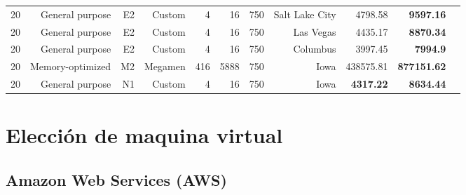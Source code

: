 \documentclass{article}
\begin{document}
\begin{adjustwidth}{-2.5 cm}{-2.5 cm}
\begin{threeparttable}[!htb]
\begin{tabular}{lrrrrrrrrrr}
\cellcolor[HTML]{ffd966}20 &\cellcolor[HTML]{ffd966}General purpose &\cellcolor[HTML]{ffd966}E2 &\cellcolor[HTML]{ffd966}Custom &\cellcolor[HTML]{ffd966}4 &\cellcolor[HTML]{ffd966}16 &\cellcolor[HTML]{ffd966}750 &\cellcolor[HTML]{ffd966}Salt Lake City &\cellcolor[HTML]{ffd966}4798.58 &\cellcolor[HTML]{ffd966}\textbf{9597.16} \\
\cellcolor[HTML]{ffd966}20 &\cellcolor[HTML]{ffd966}General purpose &\cellcolor[HTML]{ffd966}E2 &\cellcolor[HTML]{ffd966}Custom &\cellcolor[HTML]{ffd966}4 &\cellcolor[HTML]{ffd966}16 &\cellcolor[HTML]{ffd966}750 &\cellcolor[HTML]{ffd966}Las Vegas &\cellcolor[HTML]{ffd966}4435.17 &\cellcolor[HTML]{ffd966}\textbf{8870.34} \\
\cellcolor[HTML]{ffd966}20 &\cellcolor[HTML]{ffd966}General purpose &\cellcolor[HTML]{ffd966}E2 &\cellcolor[HTML]{ffd966}Custom &\cellcolor[HTML]{ffd966}4 &\cellcolor[HTML]{ffd966}16 &\cellcolor[HTML]{ffd966}750 &\cellcolor[HTML]{ffd966}Columbus &\cellcolor[HTML]{ffd966}3997.45 &\cellcolor[HTML]{ffff00}\textbf{7994.9} \\
\cellcolor[HTML]{ffd966}20 &\cellcolor[HTML]{ffd966}Memory-optimized &\cellcolor[HTML]{ffd966}M2 &\cellcolor[HTML]{ffd966}Megamen &\cellcolor[HTML]{ffd966}416 &\cellcolor[HTML]{ffd966}5888 &\cellcolor[HTML]{ffd966}750 &\cellcolor[HTML]{ffd966}Iowa &\cellcolor[HTML]{ffd966}438575.81 &\cellcolor[HTML]{ffd966}\textbf{877151.62} \\
\cellcolor[HTML]{ffff00}20 &\cellcolor[HTML]{ffff00}General purpose &\cellcolor[HTML]{ffff00}N1 &\cellcolor[HTML]{ffff00}Custom &\cellcolor[HTML]{ffff00}4 &\cellcolor[HTML]{ffff00}16 &\cellcolor[HTML]{ffff00}750 &\cellcolor[HTML]{ffff00}Iowa &\cellcolor[HTML]{ffff00}\textbf{4317.22} &\cellcolor[HTML]{ffff00}\textbf{8634.44} \\
\bottomrule
\end{tabular}
\end{threeparttable}\end{adjustwidth}


\section{Elección de maquina virtual}
  \subsection{Amazon Web Services (AWS)}
\end{document}
